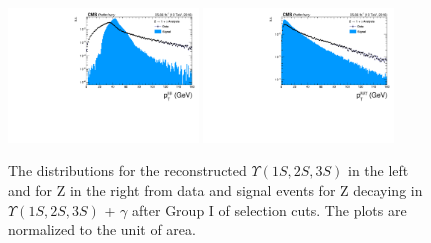 \begin{figure}[!htbp]
\begin{center}
\includegraphics[width=0.45\textwidth]{figures/outputPlots/ZtoUpsilon_Cat0_ZZZZZ/au/data_x_mc/noKinCuts/h_noKin_Upsilon_Pt}\hspace*{1.cm}
\includegraphics[width=0.45\textwidth]{figures/outputPlots/ZtoUpsilon_Cat0_ZZZZZ/au/data_x_mc/noKinCuts/h_noKin_Z_Pt}
\end{center}\vspace*{-.5cm}
\caption{The \PT distributions for the reconstructed $\Upsilon(1S,2S,3S)$ in the left and for Z in the right from data and signal events for Z decaying in $\Upsilon(1S,2S,3S)$ + $\gamma$ after Group I of selection cuts. The plots are normalized to the unit of area.}
\label{fig:pTUpsilon_and_Z_ZtoUpsilon_Cat0}
\end{figure}


